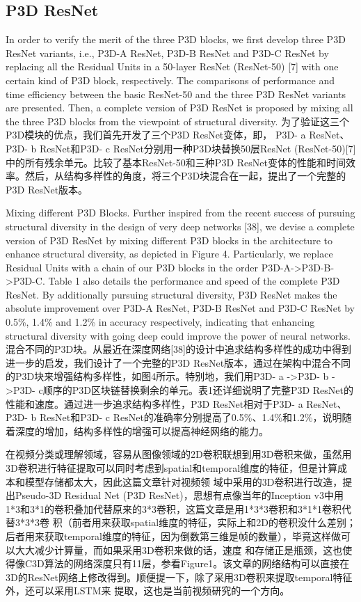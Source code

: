 \subsection{P3D ResNet}

In order to verify the merit of the three P3D blocks, we first develop three P3D ResNet variants, i.e., P3D-A ResNet, P3D-B ResNet and P3D-C ResNet by replacing all the Residual Units in a 50-layer ResNet (ResNet-50) [7] with one certain kind of P3D block, respectively. The comparisons of performance and time efficiency between the basic ResNet-50 and the three P3D ResNet variants are presented. Then, a complete version of P3D ResNet is proposed by mixing all the three P3D blocks from the viewpoint of structural diversity.
为了验证这三个P3D模块的优点，我们首先开发了三个P3D ResNet变体，即， P3D- a ResNet、P3D- b ResNet和P3D- c ResNet分别用一种P3D块替换50层ResNet (ResNet-50)[7]中的所有残余单元。比较了基本ResNet-50和三种P3D ResNet变体的性能和时间效率。然后，从结构多样性的角度，将三个P3D块混合在一起，提出了一个完整的P3D ResNet版本。

Mixing different P3D Blocks. Further inspired from the recent success of pursuing structural diversity in the design of very deep networks [38], we devise a complete version of P3D ResNet by mixing different P3D blocks in the architecture to enhance structural diversity, as depicted in Figure 4. Particularly, we replace Residual Units with a chain of our P3D blocks in the order P3D-A->P3D-B->P3D-C. Table 1 also details the performance and speed of the complete P3D ResNet. By additionally pursuing structural diversity, P3D ResNet makes the absolute improvement over P3D-A ResNet, P3D-B ResNet and P3D-C ResNet by 0.5\%, 1.4\% and 1.2\% in accuracy respectively, indicating that enhancing structural diversity with going deep could improve the power of neural networks.
混合不同的P3D块。从最近在深度网络[38]的设计中追求结构多样性的成功中得到进一步的启发，我们设计了一个完整的P3D ResNet版本，通过在架构中混合不同的P3D块来增强结构多样性，如图4所示。特别地，我们用P3D- a ->P3D- b ->P3D- c顺序的P3D区块链替换剩余的单元。表1还详细说明了完整P3D ResNet的性能和速度。通过进一步追求结构多样性，P3D ResNet相对于P3D- a ResNet、P3D- b ResNet和P3D- c ResNet的准确率分别提高了0.5\%、1.4\%和1.2\%，说明随着深度的增加，结构多样性的增强可以提高神经网络的能力。

在视频分类或理解领域，容易从图像领域的2D卷积联想到用3D卷积来做，虽然用3D卷积进行特征提取可以同时考虑到spatial和temporal维度的特征，但是计算成本和模型存储都太大，因此这篇文章针对视频领
域中采用的3D卷积进行改造，提出Pseudo-3D Residual Net (P3D ResNet)，思想有点像当年的Inception v3中用1*3和3*1的卷积叠加代替原来的3*3卷积，这篇文章是用1*3*3卷积和3*1*1卷积代替3*3*3卷
积（前者用来获取spatial维度的特征，实际上和2D的卷积没什么差别；后者用来获取temporal维度的特征，因为倒数第三维是帧的数量），毕竟这样做可以大大减少计算量，而如果采用3D卷积来做的话，速度
和存储正是瓶颈，这也使得像C3D算法的网络深度只有11层，参看Figure1。该文章的网络结构可以直接在3D的ResNet网络上修改得到。顺便提一下，除了采用3D卷积来提取temporal特征外，还可以采用LSTM来
提取，这也是当前视频研究的一个方向。


